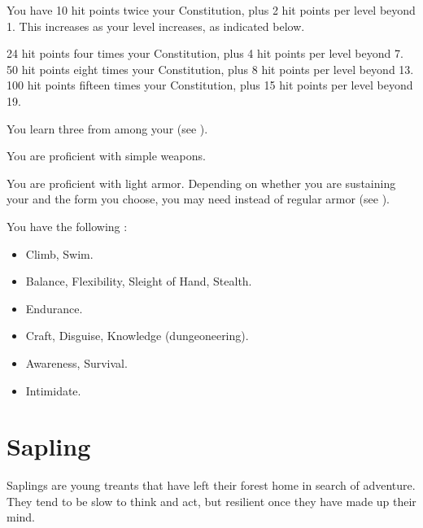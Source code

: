       You have 10 hit points \add twice your Constitution, plus 2 hit points per level beyond 1.
      This increases as your level increases, as indicated below.
      \begin{itemize}
         24 hit points \add four times your Constitution, plus 4 hit points per level beyond 7.
         50 hit points \add eight times your Constitution, plus 8 hit points per level beyond 13.
         100 hit points \add fifteen times your Constitution, plus 15 hit points per level beyond 19.
      \end{itemize}

      You learn three  from among your  (see ).

      You are proficient with simple weapons.

      You are proficient with light armor.
      Depending on whether you are sustaining your  and the form you choose, you may need  instead of regular armor (see ).

      You have the following :
      \begin{itemize}
        \item {} Climb, Swim.
        \item {} Balance, Flexibility, Sleight of Hand, Stealth.
        \item {} Endurance.
        \item {} Craft, Disguise, Knowledge (dungeoneering).
        \item {} Awareness, Survival.
        \item {} Intimidate.
      \end{itemize}

\section{Sapling}

  Saplings are young treants that have left their forest home in search of adventure.
  They tend to be slow to think and act, but resilient once they have made up their mind.

